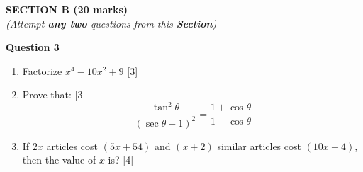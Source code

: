 \newpage
\begin{center}
   \large
   \textbf{SECTION B (20 marks)}\\
   \vspace{5mm}
   \normalsize
   \textit{(Attempt \textbf{any two} questions from this \textbf{Section})}
\end{center}
\par

\noindent
\textbf{Question 3}
\begin{enumerate}[label=(\roman*)]

    \item Factorize $x^4 - 10x^2 + 9$ \hfill [3]

    \item Prove that: \hfill [3]
        \[
            \frac{\tan^2 \theta}{(\sec \theta - 1)^2} = 
            \frac{1 + \cos \theta}{1 - \cos \theta}
        \]

    \item If $2x$ articles cost \rupee $(5x+54)$ and $(x+2)$ 
        similar articles cost \rupee $(10x-4)$, then the value of $x$ 
        is? \hfill [4]

\end{enumerate}

